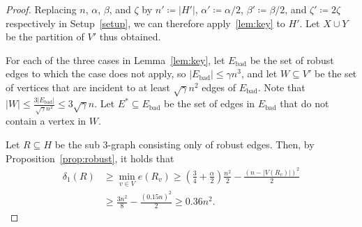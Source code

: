 \documentclass[A4paper,12pt]{article}
\theoremstyle{definition}
\begin{document}
\begin{proof}[Proof]
 
   Replacing $n$, $\alpha$, $\beta$, and $\zeta$ by  $n' \coloneqq|H'|$, $\alpha' \coloneqq \alpha/2$, $\beta' \coloneqq \beta/2$, and $\zeta' \coloneqq 2\zeta$ respectively in Setup~\ref{setup}, we can therefore apply~\cref{lem:key} to $H'$. Let $X\cup Y$ be the partition of $V'$ thus obtained. 
   
   
   For each of the three cases in Lemma~\ref{lem:key}, let $E_{\textrm{bad}}$ be the set of robust edges to which the case does not apply, so $|E_{\textrm{bad}}| \le \gamma n^3$, and let $W\subseteq V'$ be the set of vertices that are incident to at least $\sqrt{\gamma}n^2$ edges of $E_{\textrm{bad}}$. Note that $|W|\leq \frac{3|E_{\textrm{bad}}|}{\sqrt{\gamma}n^2} \le 3\sqrt{\gamma}n$. Let $E^* \subseteq E_{\textrm{bad}}$ be the set of edges in $E_{\textrm{bad}}$ that do not contain a vertex in $W$.  

    Let $R\subseteq H$ be the sub $3$-graph consisting only of robust edges.
    Then, by Proposition~\ref{prop:robust}, it holds that
    \begin{align*}
    \delta_1(R)&\geq \min_{v\in V}e(R_v)\geq \left(\frac{3}{4}+\frac{\alpha}{2}\right)\frac{n^2}{2}-\frac{(n-|V(R_v)|)^2}{2} \\
    &\geq \frac{3n^2}{8}-\frac{(0.15n)^2}{2}\geq 0.36n^2.
    \end{align*}
  

\end{proof}
\end{document}
